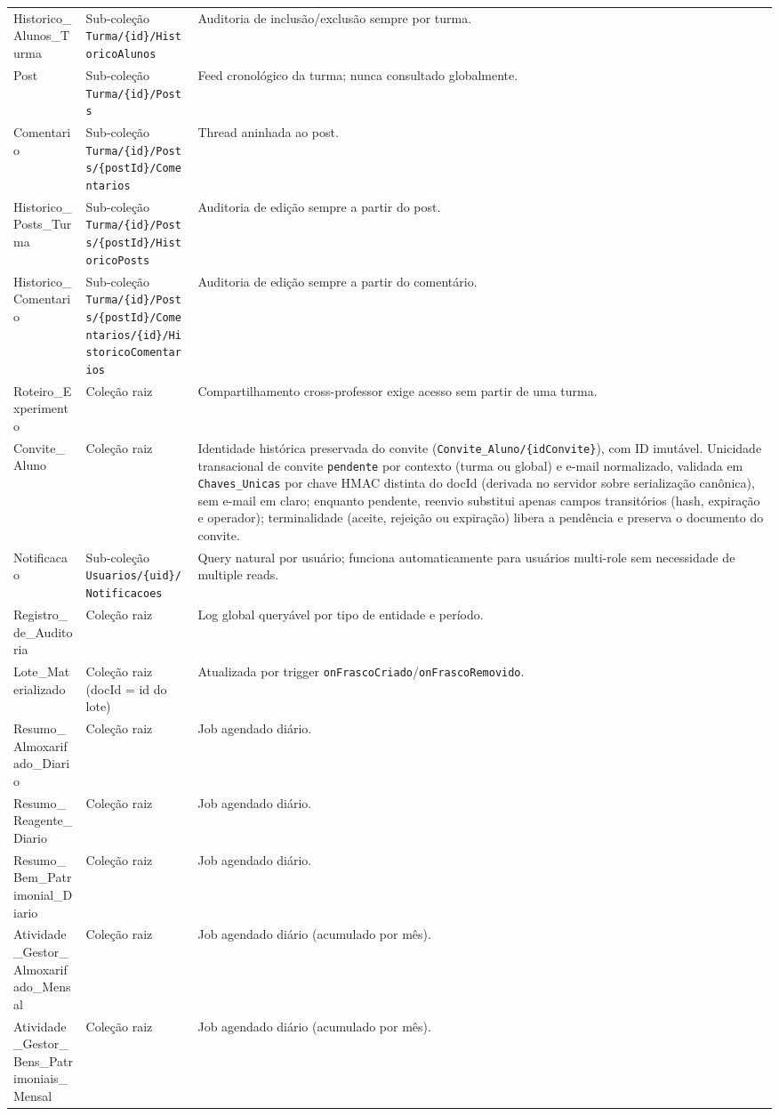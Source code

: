 \begin{longtable}{>{\raggedright\arraybackslash}p{} >{\raggedright\arraybackslash}p{} >{\raggedright\arraybackslash}p{}}
Historico\_Alunos\_Turma & Sub-coleção \nolinkurl{Turma/\{id\}/HistoricoAlunos} & Auditoria de inclusão/exclusão sempre por turma.\\
Post & Sub-coleção \nolinkurl{Turma/\{id\}/Posts} & Feed cronológico da turma; nunca consultado globalmente.\\
Comentario & Sub-coleção \nolinkurl{Turma/\{id\}/Posts/\{postId\}/Comentarios} & Thread aninhada ao post.\\
Historico\_Posts\_Turma & Sub-coleção \nolinkurl{Turma/\{id\}/Posts/\{postId\}/HistoricoPosts} & Auditoria de edição sempre a partir do post.\\
Historico\_Comentario & Sub-coleção \nolinkurl{Turma/\{id\}/Posts/\{postId\}/Comentarios/\{id\}/HistoricoComentarios} & Auditoria de edição sempre a partir do comentário.\\
Roteiro\_Experimento & Coleção raiz & Compartilhamento cross-professor exige acesso sem partir de uma turma.\\
Convite\_Aluno & Coleção raiz & Identidade histórica preservada do convite (\texttt{Convite\_Aluno/\{idConvite\}}), com ID imutável. Unicidade transacional de convite \texttt{pendente} por contexto (turma ou global) e e-mail normalizado, validada em \texttt{Chaves\_Unicas} por chave HMAC distinta do docId (derivada no servidor sobre serialização canônica), sem e-mail em claro; enquanto pendente, reenvio substitui apenas campos transitórios (hash, expiração e operador); terminalidade (aceite, rejeição ou expiração) libera a pendência e preserva o documento do convite.\\
Notificacao & Sub-coleção \nolinkurl{Usuarios/\{uid\}/Notificacoes} & Query natural por usuário; funciona automaticamente para usuários multi-role sem necessidade de multiple reads.\\
Registro\_de\_Auditoria & Coleção raiz & Log global queryável por tipo de entidade e período.\\
Lote\_Materializado & Coleção raiz (docId = id do lote) & Atualizada por trigger \texttt{onFrascoCriado}\allowbreak/\allowbreak\texttt{onFrascoRemovido}.\\
Resumo\_Almoxarifado\_Diario & Coleção raiz & Job agendado diário.\\
Resumo\_Reagente\_Diario & Coleção raiz & Job agendado diário.\\
Resumo\_Bem\_Patrimonial\_Diario & Coleção raiz & Job agendado diário.\\
Atividade\_Gestor\_Almoxarifado\_Mensal & Coleção raiz & Job agendado diário (acumulado por mês).\\
Atividade\_Gestor\_Bens\_Patrimoniais\_Mensal & Coleção raiz & Job agendado diário (acumulado por mês).\\
\end{longtable}


